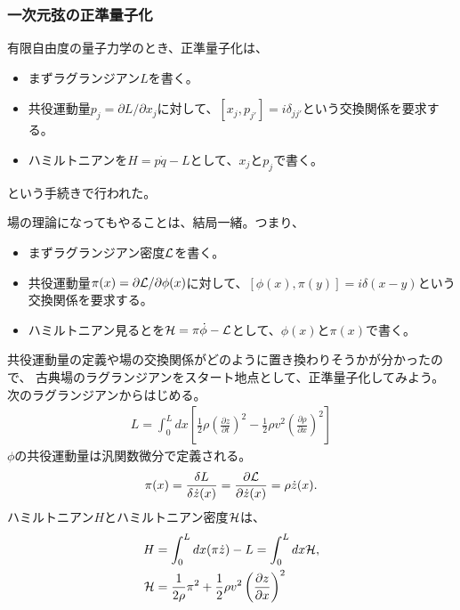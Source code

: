 \documentclass[10pt,a4paper]{jarticle}
\begin{document}
\subsubsection{一次元弦の正準量子化}
有限自由度の量子力学のとき、正準量子化は、
\begin{itemize}
\item まずラグランジアン$L$を書く。
\item 共役運動量$p_j = \partial L / \partial x_j$に対して、$[x_j, p_{j'}] = i \delta_{jj'}$という交換関係を要求する。
\item ハミルトニアンを$H = p \dot q - L$として、$x_j$と$p_j$で書く。
\end{itemize}
という手続きで行われた。

場の理論になってもやることは、結局一緒。つまり、
\begin{itemize}
\item まずラグランジアン密度${\cal L}$を書く。
\item 共役運動量$\pi(x) = \partial {\cal L} / \partial \phi(x)$に対して、$[\phi(x), \pi(y)] = i \delta(x-y)$という交換関係を要求する。
\item ハミルトニアン見るとを${\cal H} = \pi \dot \phi - {\cal L}$として、$\phi(x)$と$\pi(x)$で書く。
\end{itemize}



共役運動量の定義や場の交換関係がどのように置き換わりそうかが分かったので、
古典場のラグランジアンをスタート地点として、正準量子化してみよう。
次のラグランジアンからはじめる。
\begin{align}
L = \int_0^L dx \left[ \frac{1}{2}\rho \left( \frac{\partial z}{\partial t} \right)^2 - \frac{1}{2} \rho v^2 \left( \frac{\partial\rho}{\partial x} \right)^2 \right]
\end{align}
%
$\phi$の共役運動量は汎関数微分で定義される。
\begin{align}
\pi(x) = \frac{\delta L}{\delta \dot z(x)} = \frac{\partial{\cal L}}{\partial \dot z(x)}
= \rho \dot z(x).
\end{align}
%
ハミルトニアン$H$とハミルトニアン密度${\cal H}$は、
\begin{align}
H &= \int_0^L dx (\pi \dot z) - L = \int_0^L dx {\cal H}, \\
{\cal H} &= \frac{1}{2\rho} \pi^2 + \frac{1}{2}\rho v^2 \left( \frac{\partial z}{\partial x}\right)^2
\end{align}
\end{document}
